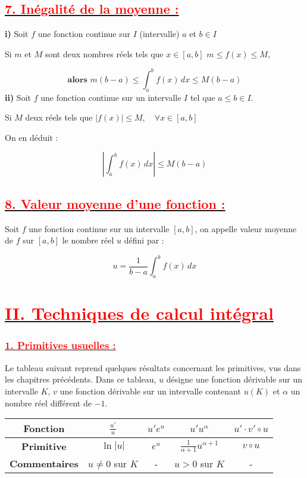 \documentclass[12pt]{article}
\begin{document}
\subsection*{\underline{\textbf{\textcolor{red}{7. Inégalité de la moyenne :}}}}

\textbf{i)} Soit \( f \) une fonction continue sur \( I \) (intervalle) \( a \) et \( b \in I \)

Si \( m \) et \( M \) sont deux nombres réels tels que \( x \in [a, b] \) \( m \leq f(x) \leq M \),  

\[
\textbf{alors }m (b - a) \leq \int_a^b f(x) \, dx \leq M(b - a)
\]  
\textbf{ii)} Soit \( f \) une fonction continue sur un intervalle \( I \) tel que \( a \leq b \in I \).

Si  \( M \) deux réels tels que \(|f(x)| \leq M, \quad \forall x \in [a,b]\)

On en déduit :

\[
\left| \int_a^b f(x) \, dx \right| \leq M (b-a)
\]

\subsection*{\underline{\textbf{\textcolor{red}{8. Valeur moyenne d'une fonction :}}}}

Soit \( f \) une fonction continue sur un intervalle \( [a, b] \), on appelle valeur moyenne de \( f \) sur \( [a, b] \) le nombre réel \( u \) défini par :

\[
u = \frac{1}{b - a} \int_a^b f(x) \, dx
\]
\section*{\underline{\textbf{\textcolor{red}{II. Techniques de calcul intégral}}}}

\subsubsection*{\underline{\textcolor{red}{1. Primitives usuelles :}}}
Le tableau suivant reprend quelques résultats concernant les primitives, vus dans les chapitres précédents. Dans ce tableau, \( u \) désigne une fonction dérivable sur un intervalle \( K \), \( v \) une fonction dérivable sur un intervalle contenant \( u(K) \) et \( \alpha \) un nombre réel différent de \( -1 \).

\begin{tabular}{|c|c|c|c|c|}
\hline
\textbf{Fonction} & \( \frac{u'}{u} \) & \( u' e^u \) & \( u' u^\alpha \) & \( u' \cdot v' \circ u \) \\
\hline
\textbf{Primitive} & \( \ln |u| \) & \( e^u \) & \( \frac{1}{\alpha + 1} u^{\alpha + 1} \) & \( v \circ u \) \\
\hline
\textbf{Commentaires} & \( u \neq 0 \) sur \( K \) & - & \( u > 0 \) sur \( K \) & - \\
\hline
\end{tabular}
\end{document}
